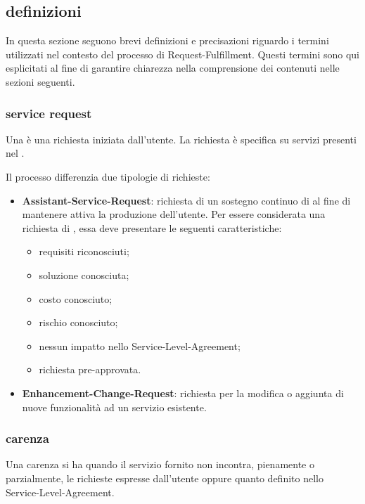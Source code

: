 \subsection[Definizioni]{definizioni}
\label{rf-introduction-definitions}
In questa sezione seguono brevi definizioni e precisazioni riguardo i termini utilizzati nel contesto del processo di \ac{Request-Fulfillment}. Questi termini sono qui esplicitati al fine di garantire chiarezza nella comprensione dei contenuti nelle sezioni seguenti.

\subsubsection{service request}
Una  è una richiesta iniziata dall'utente. La richiesta è specifica su servizi presenti nel .

Il processo differenzia due tipologie di richieste:

\begin{itemize}
\item{\textbf{\ac{Assistant-Service-Request}}: richiesta di un sostegno continuo di  al fine di mantenere attiva la produzione dell'utente. Per essere considerata una richiesta di , essa deve presentare le seguenti caratteristiche:}
\begin{itemize}
\item{requisiti riconosciuti;}
\item{soluzione conosciuta;}
\item{costo conosciuto;}
\item{rischio conosciuto;}
\item{nessun impatto nello \ac{Service-Level-Agreement};}
\item{richiesta pre-approvata.}
\end{itemize}
\item{\textbf{\ac{Enhancement-Change-Request}}: richiesta per la modifica o aggiunta di nuove funzionalità ad un servizio esistente.}
\end{itemize}

\subsubsection{carenza}
Una carenza si ha quando il servizio fornito non incontra, pienamente o parzialmente, le richieste espresse dall'utente oppure quanto definito nello \ac{Service-Level-Agreement}.

